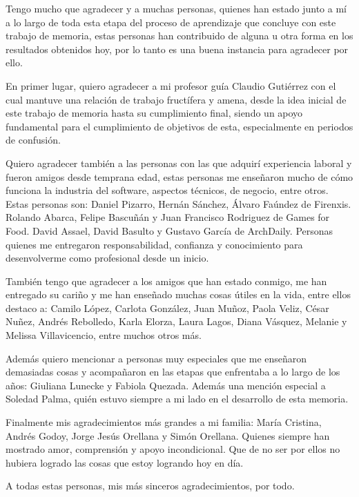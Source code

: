 \begin{thanks}
  Tengo mucho que agradecer y a muchas personas, quienes han estado junto a mí a lo largo de toda esta etapa del proceso de aprendizaje que concluye con este trabajo de memoria, estas personas han contribuido de alguna u otra forma en los resultados obtenidos hoy, por lo tanto es una buena instancia para agradecer por ello.
  
  En primer lugar, quiero agradecer a mi profesor guía Claudio Gutiérrez con el cual mantuve una relación de trabajo fructífera y amena, desde la idea inicial de este trabajo de memoria hasta su cumplimiento final, siendo un apoyo fundamental para el cumplimiento de objetivos de esta, especialmente en periodos de confusión.
  
  Quiero agradecer también a las personas con las que adquirí experiencia laboral y fueron amigos desde temprana edad, estas personas me enseñaron mucho de cómo funciona la industria del software, aspectos técnicos, de negocio, entre otros. Estas personas son: Daniel Pizarro, Hernán Sánchez, Álvaro Faúndez de Firenxis. Rolando Abarca, Felipe Bascuñán y Juan Francisco Rodriguez de Games for Food. David Assael, David Basulto y Gustavo García de ArchDaily. Personas quienes me entregaron responsabilidad, confianza y conocimiento para desenvolverme como profesional desde un inicio.
  
  También tengo que agradecer a los amigos que han estado conmigo, me han entregado su cariño y me han enseñado muchas cosas útiles en la vida, entre ellos destaco a: Camilo López, Carlota González, Juan Muñoz, Paola Veliz, César Nuñez, Andrés Rebolledo, Karla Elorza, Laura Lagos, Diana Vásquez, Melanie y Melissa Villavicencio, entre muchos otros más.
  
  Además quiero mencionar a personas muy especiales que me enseñaron demasiadas cosas y acompañaron en las etapas que enfrentaba a lo largo de los años: Giuliana Lunecke y Fabiola Quezada. Además una mención especial a Soledad Palma, quién estuvo siempre a mi lado en el desarrollo de esta memoria.
  
  Finalmente mis agradecimientos más grandes a mi familia: María Cristina, Andrés Godoy, Jorge Jesús Orellana y Simón Orellana. Quienes siempre han mostrado amor, comprensión y apoyo incondicional. Que de no ser por ellos no hubiera logrado las cosas que estoy logrando hoy en día.
  
  A todas estas personas, mis más sinceros agradecimientos, por todo.
\end{thanks}